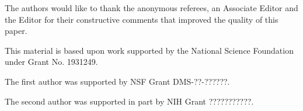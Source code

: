 \documentclass[aoas]{imsart}
\theoremstyle{plain}
\theoremstyle{remark}
\begin{document}
\begin{acks}[Acknowledgments]
The authors would like to thank the anonymous referees, an Associate
Editor and the Editor for their constructive comments that improved the
quality of this paper.
\end{acks}

\begin{funding}
This material is based upon work supported by the National Science Foundation under Grant No. 1931249.
	
The first author was supported by NSF Grant DMS-??-??????.

The second author was supported in part by NIH Grant ???????????.
\end{funding}

\begin{supplement}
\end{supplement}


\end{document}
